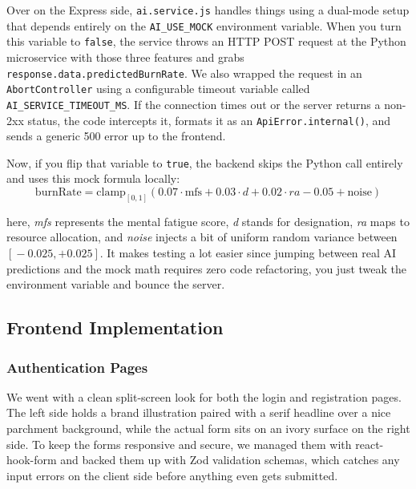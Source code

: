 \documentclass[12pt,a4paper]{article}
\begin{document}
Over on the Express side, \texttt{ai.service.js} handles things using a dual-mode setup that depends entirely on the \texttt{AI\_USE\_MOCK} environment variable. When you turn this variable to \texttt{false}, the service throws an HTTP POST request at the Python microservice with those three features and grabs \texttt{response.data.predictedBurnRate}. We also wrapped the request in an \texttt{AbortController} using a configurable timeout variable called \texttt{AI\_SERVICE\_TIMEOUT\_MS}. If the connection times out or the server returns a non-2xx status, the code intercepts it, formats it as an \texttt{ApiError.internal()}, and sends a generic 500 error up to the frontend.

Now, if you flip that variable to \texttt{true}, the backend skips the Python call entirely and uses this mock formula locally:
\begin{equation}
  \text{burnRate} = \text{clamp}_{[0,1]}\!\left(
    0.07 \cdot \text{mfs} + 0.03 \cdot d + 0.02 \cdot ra - 0.05
    + \text{noise}
  \right)
  \label{eq:mock-formula}
\end{equation}

\noindent here, \textit{mfs} represents the mental fatigue score, \textit{d} stands for designation, \textit{ra} maps to resource allocation, and \textit{noise} injects a bit of uniform random variance between $[\!-0.025, +0.025]$. It makes testing a lot easier since jumping between real AI predictions and the mock math requires zero code refactoring, you just tweak the environment variable and bounce the server.

\subsection{Frontend Implementation}

\subsubsection{Authentication Pages}

We went with a clean split-screen look for both the login and registration pages. The left side holds a brand illustration paired with a serif headline over a nice parchment background, while the actual form sits on an ivory surface on the right side. To keep the forms responsive and secure, we managed them with react-hook-form and backed them up with Zod validation schemas, which catches any input errors on the client side before anything even gets submitted.
\end{document}

